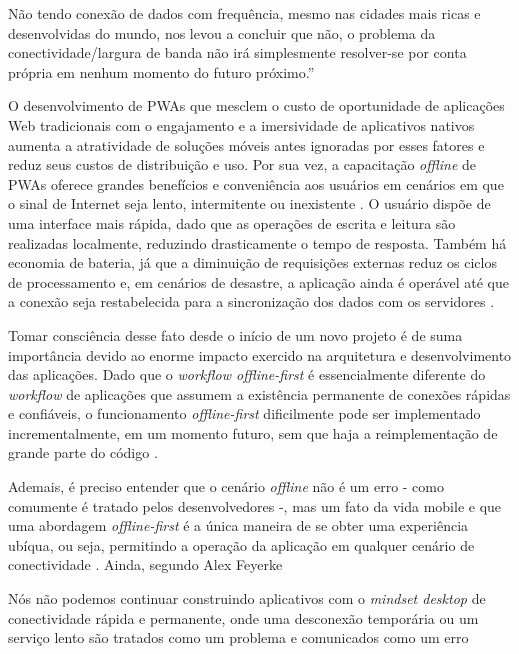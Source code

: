 \documentclass[
	article,			%
	11pt,				%
	oneside,			%
	a4paper,			%
	english,			%
	brazil,				%
	sumario=tradicional
	]{abntex2}
\begin{document}
\begin{citacao}
	Não tendo conexão de dados com frequência, mesmo nas cidades mais ricas e desenvolvidas do mundo, nos levou a concluir que não, o problema da conectividade/largura de banda não irá simplesmente resolver-se por conta própria em nenhum momento do futuro próximo.” \cite[tradução nossa]{feyerke-2013}
\end{citacao}

O desenvolvimento de PWAs que mesclem o custo de oportunidade de aplicações Web tradicionais com o engajamento e a imersividade de aplicativos nativos aumenta a atratividade de soluções móveis antes ignoradas por esses fatores e reduz seus custos de distribuição e uso. Por sua vez, a capacitação \textit{offline} de PWAs oferece grandes benefícios e conveniência aos usuários em cenários em que o sinal de Internet seja lento, intermitente ou inexistente \cite{da-14-2017}. O usuário dispõe de uma interface mais rápida, dado que as operações de escrita e leitura são realizadas localmente, reduzindo drasticamente o tempo de resposta. Também há economia de bateria, já que a diminuição de requisições externas reduz os ciclos de processamento e, em cenários de desastre, a aplicação ainda é operável até que a conexão seja restabelecida para a sincronização dos dados com os servidores \cite{holt-2015}.

Tomar consciência desse fato desde o início de um novo projeto é de suma importância devido ao enorme impacto exercido na arquitetura e desenvolvimento das aplicações. Dado que o \textit{workflow  offline-first} é essencialmente diferente do \textit{workflow} de aplicações que assumem a existência permanente de conexões rápidas e confiáveis, o funcionamento \textit{offline-first} dificilmente pode ser implementado incrementalmente, em um momento futuro, sem que haja a reimplementação de grande parte do código \cite{prasad-2011}.

Ademais, é preciso entender que o cenário \textit{offline} não é um erro - como comumente é tratado pelos desenvolvedores -, mas um fato da vida mobile \cite{feyerke-2014} e que uma abordagem \textit{offline-first} é a única maneira de se obter uma experiência ubíqua, ou seja, permitindo a operação da aplicação em qualquer cenário de conectividade \cite{holt-2015}. Ainda, segundo Alex Feyerke

\begin{citacao}
	Nós não podemos continuar construindo aplicativos com o \textit{mindset desktop} de conectividade rápida e permanente, onde uma desconexão temporária ou um serviço lento são tratados como um problema e comunicados como um erro \cite[tradução nossa]{feyerke-2013}
\end{citacao}
\end{document}
